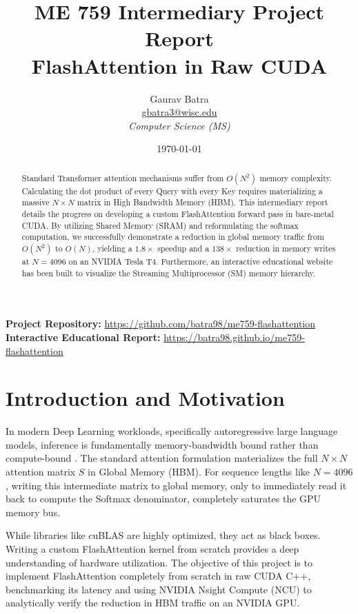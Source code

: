 \documentclass[12pt]{article}
\title{ME 759 Intermediary Project Report\\ \Large FlashAttention in Raw CUDA}
\author{Gaurav Batra \\ \href{mailto:gbatra3@wisc.edu}{gbatra3@wisc.edu} \\ \textit{Computer Science (MS)}}
\date{\today}
\begin{document}
\maketitle

\vspace{-1.5em}
\begin{center}
    \textbf{Project Repository:} \url{https://github.com/batra98/me759-flashattention} \\
    \vspace{0.3em}
    \textbf{Interactive Educational Report:} \url{https://batra98.github.io/me759-flashattention}
\end{center}
\vspace{1em}

\begin{abstract}
Standard Transformer attention mechanisms suffer from $O(N^2)$ memory complexity. Calculating the dot product of every Query with every Key requires materializing a massive $N \times N$ matrix in High Bandwidth Memory (HBM). This intermediary report details the progress on developing a custom FlashAttention forward pass in bare-metal CUDA. By utilizing Shared Memory (SRAM) and reformulating the softmax computation, we successfully demonstrate a reduction in global memory traffic from $O(N^2)$ to $O(N)$, yielding a $1.8\times$ speedup and a $138\times$ reduction in memory writes at $N=4096$ on an NVIDIA Tesla T4. Furthermore, an interactive educational website has been built to visualize the Streaming Multiprocessor (SM) memory hierarchy.
\end{abstract}

\section{Introduction and Motivation}
In modern Deep Learning workloads, specifically autoregressive large language models, inference is fundamentally memory-bandwidth bound rather than compute-bound \cite{dao2022}. The standard attention formulation materializes the full $N \times N$ attention matrix $S$ in Global Memory (HBM). For sequence lengths like $N=4096$, writing this intermediate matrix to global memory, only to immediately read it back to compute the Softmax denominator, completely saturates the GPU memory bus.

While libraries like cuBLAS are highly optimized, they act as black boxes. Writing a custom FlashAttention kernel from scratch provides a deep understanding of hardware utilization. The objective of this project is to implement FlashAttention \cite{dao2022} completely from scratch in raw CUDA C++, benchmarking its latency and using NVIDIA Nsight Compute (NCU) to analytically verify the reduction in HBM traffic on an NVIDIA GPU.
\end{document}
